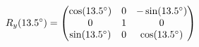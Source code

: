 \documentclass[preview]{standalone}
\begin{document}
\begin{align*}
\special{dvisvgm:raw <g id='unique000'>}R_y(13.5^\circ) = \begin{pmatrix} \cos(13.5^\circ) & 0 & -\sin(13.5^\circ) \\ 0 & 1 & 0 \\ \sin(13.5^\circ) & 0 & \cos(13.5^\circ) \end{pmatrix}\special{dvisvgm:raw </g>}
\end{align*}
\end{document}

